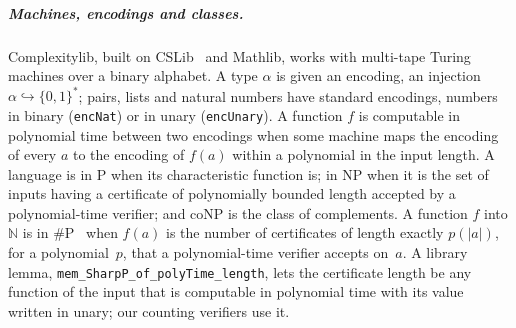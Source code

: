 \documentclass[a4paper,UKenglish,cleveref,autoref,thm-restate]{lipics-v2021}
\begin{document}
\subparagraph*{Machines, encodings and classes.}
Complexitylib, built on CSLib~\cite{CSLib2026} and Mathlib, works with multi-tape Turing
machines over a binary alphabet. A type $\alpha$ is
given an encoding, an injection $\alpha \hookrightarrow \{0,1\}^*$; pairs, lists and natural
numbers have standard encodings, numbers in binary (\lstinline{encNat}) or in unary
(\lstinline{encUnary}). A function $f$ is computable in polynomial time between two encodings
when some machine maps the encoding of every $a$ to the encoding of $f(a)$ within a polynomial
in the input length. A language is in P when its characteristic function is; in NP when it is
the set of inputs having a certificate of polynomially bounded length accepted by a
polynomial-time verifier; and coNP is the class of complements. A function $f$ into
$\mathbb{N}$ is in \#P~\cite{Valiant1979permanent} when $f(a)$ is the number of certificates of length exactly $p(|a|)$,
for a polynomial~$p$, that a polynomial-time verifier accepts on~$a$. A library lemma,
\lstinline{mem_SharpP_of_polyTime_length}, lets the certificate length be any function of the input that is computable in polynomial
time with its value written in unary; our counting verifiers use it.
\end{document}

